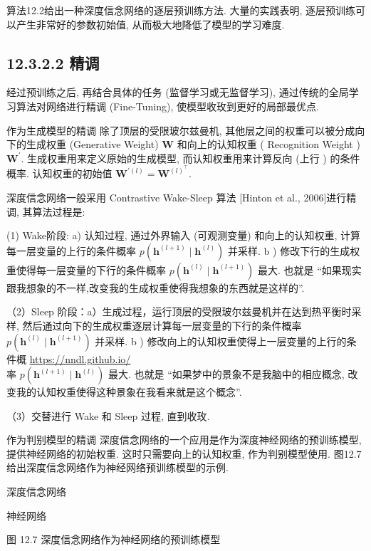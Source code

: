 \documentclass[10pt]{article}
\begin{document}
算法12.2给出一种深度信念网络的逐层预训练方法. 大量的实践表明, 逐层预训练可以产生非常好的参数初始值, 从而极大地降低了模型的学习难度.



\subsection*{12.3.2.2 精调}
经过预训练之后, 再结合具体的任务 (监督学习或无监督学习), 通过传统的全局学习算法对网络进行精调 (Fine-Tuning), 使模型收玫到更好的局部最优点.

作为生成模型的精调 除了顶层的受限玻尔兹曼机, 其他层之间的权重可以被分成向下的生成权重 (Generative Weight) $\boldsymbol{W}$ 和向上的认知权重 ( Recognition Weight ) $\boldsymbol{W}^{\prime}$. 生成权重用来定义原始的生成模型, 而认知权重用来计算反向 (上行 ) 的条件概率. 认知权重的初始值 $\boldsymbol{W}^{\prime(l)}=\boldsymbol{W}^{(l)^{\top}}$.

深度信念网络一般采用 Contrastive Wake-Sleep 算法 [Hinton et al., 2006]进行精调, 其算法过程是:

(1) Wake阶段: a) 认知过程, 通过外界输入 (可观测变量) 和向上的认知权重, 计算每一层变量的上行的条件概率 $p\left(\boldsymbol{h}^{(l+1)} \mid \boldsymbol{h}^{(l)}\right)$ 并采样. b ) 修改下行的生成权重使得每一层变量的下行的条件概率 $p\left(\boldsymbol{h}^{(l)} \mid \boldsymbol{h}^{(l+1)}\right)$ 最大. 也就是 “如果现实跟我想象的不一样,改变我的生成权重使得我想象的东西就是这样的”.

（2）Sleep 阶段：a）生成过程，运行顶层的受限玻尔兹曼机并在达到热平衡时采样, 然后通过向下的生成权重逐层计算每一层变量的下行的条件概率 $p\left(\boldsymbol{h}^{(l)} \mid \boldsymbol{h}^{(l+1)}\right)$ 并采样. b ) 修改向上的认知权重使得上一层变量的上行的条件概 \href{https://nndl.github.io/}{https://nndl.github.io/}\\
率 $p\left(\boldsymbol{h}^{(l+1)} \mid \boldsymbol{h}^{(l)}\right)$ 最大. 也就是 “如果梦中的景象不是我脑中的相应概念, 改变我的认知权重使得这种景象在我看来就是这个概念”.

（3）交替进行 Wake 和 Sleep 过程, 直到收玫.

作为判别模型的精调 深度信念网络的一个应用是作为深度神经网络的预训练模型, 提供神经网络的初始权重. 这时只需要向上的认知权重, 作为判别模型使用. 图12.7给出深度信念网络作为神经网络预训练模型的示例.



深度信念网络



神经网络

图 12.7 深度信念网络作为神经网络的预训练模型
\end{document}

